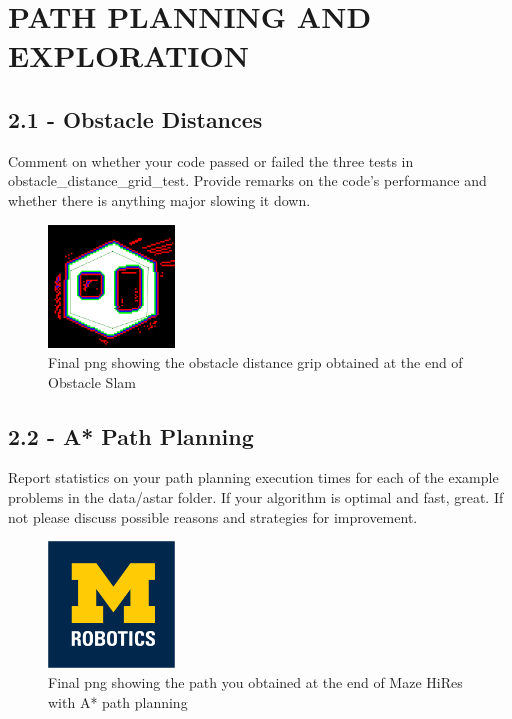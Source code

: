 \documentclass[journal,onecolumn]{IEEEtran}
\begin{document}
\section{PATH PLANNING AND EXPLORATION}

\subsection*{2.1 - Obstacle Distances} 

Comment on whether your code passed or failed the three tests in obstacle\_distance\_grid\_test. Provide remarks on the code’s performance and whether there is anything major slowing it down.

\begin{figure}[H]
\centering
\includegraphics[width=0.3\textwidth]{Media/21.png}
\caption{Final png showing the obstacle distance grip obtained at the end of Obstacle Slam}
\end{figure}


\subsection*{2.2 - A* Path Planning} 

Report statistics on your path planning execution times for each of the example problems in the data/astar folder. If your algorithm is optimal and fast, great. If not please discuss possible reasons and strategies for improvement.

\begin{figure}[H]
\centering
\includegraphics[width=0.3\textwidth]{Media/template-robotics.jpg}
\caption{Final png showing the path you obtained at the end of Maze HiRes with A* path planning}
\end{figure}
\end{document}
